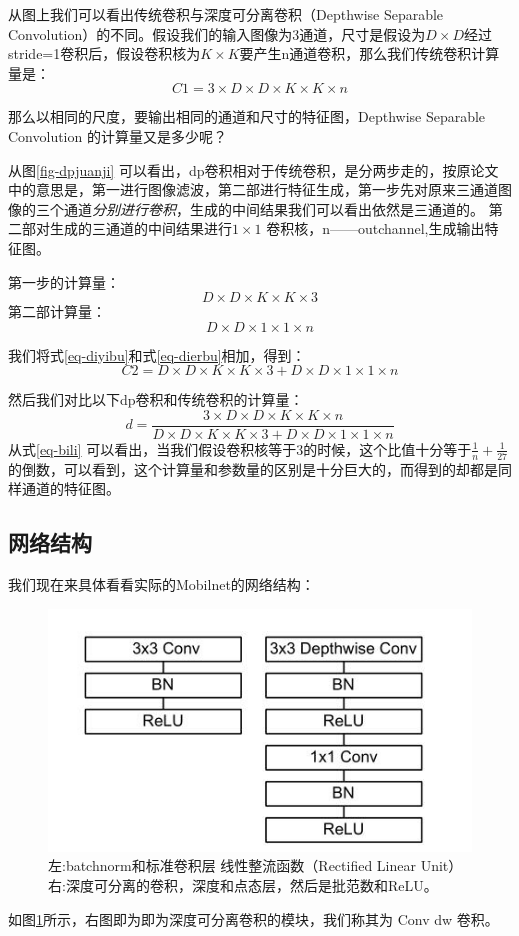 \documentclass[UTF8,a4paper,12pt]{ctexart}
\begin{document}
从图上我们可以看出传统卷积与深度可分离卷积（Depthwise Separable Convolution）的不同。假设我们的输入图像为3通道，尺寸是假设为$D \times D$经过stride=1卷积后，假设卷积核为$K \times K $要产生n通道卷积，那么我们传统卷积计算量是：
\begin{equation}
	C1 = 3 \times D \times D \times K \times K \times n
	\label{eq-chuantongjisuanliang}
\end{equation}
 
那么以相同的尺度，要输出相同的通道和尺寸的特征图，Depthwise Separable Convolution 的计算量又是多少呢？

从图\autoref{fig-dpjuanji} 可以看出，dp卷积相对于传统卷积，是分两步走的，按原论文中的意思是，第一进行图像滤波，第二部进行特征生成，第一步先对原来三通道图像的三个通道\emph{分别进行卷积}，生成的中间结果我们可以看出依然是三通道的。
第二部对生成的三通道的中间结果进行$1 \times 1$ 卷积核，n——outchannel,生成输出特征图。

第一步的计算量：
\begin{equation}
D \times D \times K \times 	K \times 3 
\label{eq-diyibu}
\end{equation}
第二部计算量：
\begin{equation}
	D \times D \times 1 \times 1 \times n
	\label{eq-dierbu}
\end{equation}

我们将式\ref{eq-diyibu}和式\ref{eq-dierbu}相加，得到：
\begin{equation}
	C2 = D \times D \times K \times 	K \times 3 + D \times D \times 1 \times 1 \times n
	\label{eq-zongjisuanliang}
\end{equation}

然后我们对比以下dp卷积和传统卷积的计算量：
\begin{equation}
	d = \frac{3 \times D \times D \times K \times K \times n}{D \times D \times K \times 	K \times 3 + D \times D \times 1 \times 1 \times n}
	\label{eq-bili}
	\end{equation}
从式\ref{eq-bili} 可以看出，当我们假设卷积核等于3的时候，这个比值十分等于$\frac{1}{n} + \frac{1}{27}$ 的倒数，可以看到，这个计算量和参数量的区别是十分巨大的，而得到的却都是同样通道的特征图。

\subsection{网络结构}
我们现在来具体看看实际的Mobilnet的网络结构：
\begin{figure}[htbp]
	\centering
	\includegraphics[width=0.5\linewidth]{webmin/juanjistr.jpg}
	\caption{左:batchnorm和标准卷积层
		线性整流函数（Rectified Linear Unit）右:深度可分离的卷积，深度和点态层，然后是批范数和ReLU。}
	\label{fig-duibi}
\end{figure}
如图\ref{fig-duibi}所示，右图即为即为深度可分离卷积的模块，我们称其为 {\heiti Conv dw} 卷积。
\end{document}
